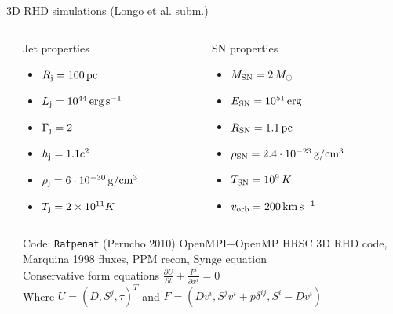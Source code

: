 \begin{frame}{3D RHD simulations (Longo et al. subm.)}
\begin{columns}
{\begin{column}{0.5\textwidth}
		\end{column}}
		\begin{column}{0.7\textwidth}
			{\scriptsize
		 \begin{columns}\begin{column}{.5\textwidth}
		  \begin{alertblock}{Jet properties}
			\begin{itemize}
		      \item $R_{\rm j} = 100\,{\rm pc}$
			  \item $L_{\rm j} = 10^{44}\,{\rm erg}\,{\rm s}^{-1}$
			  \item $\Gamma_{\rm j}=2$
			  \item $h_{\rm j} = 1.1c^{2}$
			  \item $\rho_{\rm j} = 6\cdot10^{-30}\,{\rm g}/{\rm cm}^{3}$
			  \item $T_{\rm j} = 2\times 10^{11} K$
			\end{itemize}
		   \end{alertblock}
		  \end{column}
		  \hspace{-2cm}
		  \begin{column}{.5\textwidth}
		   \begin{exampleblock}{SN properties}
		     \begin{itemize}
					\item $M_{\rm SN}=2\,M_\odot$
					\item $E_{\rm SN}=10^{51}\,{\rm erg}$
					\item $R_{\rm SN}=1.1\,{\rm pc}$
					\item $\rho_{\rm SN}= 2.4\cdot10^{-23}\,{\rm g}/{\rm cm}^{3}$
					\item $T_{\rm SN} = 10^{9}\,K$
					\item $v_{\rm orb} = 200\,{\rm km}\,{\rm s}^{-1}$
				\end{itemize}
			\end{exampleblock}
		 \end{column}
		\end{columns}}
		\vspace{1cm}
		{\scriptsize
		\begin{block}{Code: \texttt{Ratpenat} (Perucho 2010)}
			OpenMPI+OpenMP HRSC 3D RHD code, Marquina 1998 fluxes, PPM recon, Synge equation
			\\
				Conservative form equations $\frac{\partial U}{\partial t}+\frac{F^{i}}{\partial x^{i}}=0$\\
				Where $U=(D,S^{j},\tau)^{T}$ and $F = (Dv^{i}, S^{j}v^{i}+p\delta^{ij}, S^{i}-Dv^{i}) $
		\end{block}
			}
		\end{column}
	\end{columns}
\end{frame}
